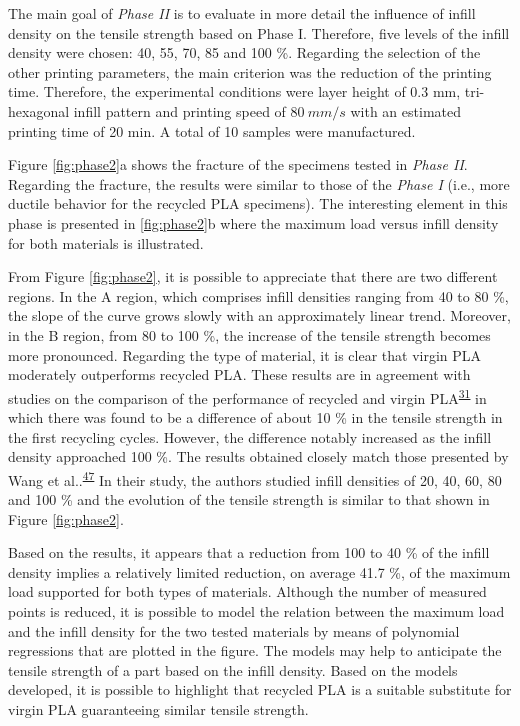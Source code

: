 \documentclass[
  12pt]{article}
\begin{document}
The main goal of \emph{Phase II} is to evaluate in more detail the influence of infill density on the tensile strength based on Phase I.
Therefore, five levels of the infill density were chosen: 40, 55, 70, 85 and 100 \%. Regarding the selection of the other printing parameters, the main criterion was the reduction of the printing time.
Therefore, the experimental conditions were layer height of 0.3 mm, tri-hexagonal infill pattern and printing speed of \(80~mm/s\) with an estimated printing time of 20 min.
A total of 10 samples were manufactured.

Figure \ref{fig:phase2}a shows the fracture of the specimens tested in \emph{Phase II}. Regarding the fracture, the results were similar to those of the \emph{Phase I} (i.e., more ductile behavior for the recycled PLA specimens).
The interesting element in this phase is presented in \ref{fig:phase2}b where the maximum load versus infill density for both materials is illustrated.

From Figure \ref{fig:phase2}, it is possible to appreciate that there are two different regions.
In the A region, which comprises infill densities ranging from 40 to 80 \%, the slope of the curve grows slowly with an approximately linear trend.
Moreover, in the B region, from 80 to 100 \%, the increase of the tensile strength becomes more pronounced.
Regarding the type of material, it is clear that virgin PLA moderately outperforms recycled PLA.
These results are in agreement with studies on the comparison of the performance of recycled and virgin PLA\textsuperscript{\protect\hyperlink{ref-CruzSanchez2017}{31}} in which there was found to be a difference of about 10 \% in the tensile strength in the first recycling cycles.
However, the difference notably increased as the infill density approached 100 \%. The results obtained closely match those presented by Wang et al..\textsuperscript{\protect\hyperlink{ref-Wang2020h}{47}}
In their study, the authors studied infill densities of 20, 40, 60, 80 and 100 \% and the evolution of the tensile strength is similar to that shown in Figure \ref{fig:phase2}.

Based on the results, it appears that a reduction from 100 to 40 \% of the infill density implies a relatively limited reduction, on average 41.7 \%, of the maximum load supported for both types of materials.
Although the number of measured points is reduced, it is possible to model the relation between the maximum load and the infill density for the two tested materials by means of polynomial regressions that are plotted in the figure.
The models may help to anticipate the tensile strength of a part based on the infill density.
Based on the models developed, it is possible to highlight that recycled PLA is a suitable substitute for virgin PLA guaranteeing similar tensile strength.
\end{document}
